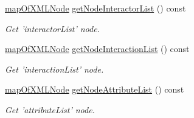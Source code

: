 \begin{DoxyCompactItemize}
\hyperlink{classunisys_1_1PSIMI_a0cc51198d3cd685cfa21a42c5dc0ee7f}{map\-Of\-X\-M\-L\-Node} \hyperlink{classunisys_1_1PSIMI_a3c7fac640a804b0e46a7dcc233b0aa05}{get\-Node\-Interactor\-List} () const 
\begin{DoxyCompactList}\small\item\em Get 'interactor\-List' node. \end{DoxyCompactList}\item 
\hyperlink{classunisys_1_1PSIMI_a0cc51198d3cd685cfa21a42c5dc0ee7f}{map\-Of\-X\-M\-L\-Node} \hyperlink{classunisys_1_1PSIMI_a2253e5f2637090b29f231f94e3f23a89}{get\-Node\-Interaction\-List} () const 
\begin{DoxyCompactList}\small\item\em Get 'interaction\-List' node. \end{DoxyCompactList}\item 
\hyperlink{classunisys_1_1PSIMI_a0cc51198d3cd685cfa21a42c5dc0ee7f}{map\-Of\-X\-M\-L\-Node} \hyperlink{classunisys_1_1PSIMI_afc45d63f72bad94f4c26e87c2e7d8f94}{get\-Node\-Attribute\-List} () const 
\begin{DoxyCompactList}\small\item\em Get 'attribute\-List' node. \end{DoxyCompactList}\end{DoxyCompactItemize}
